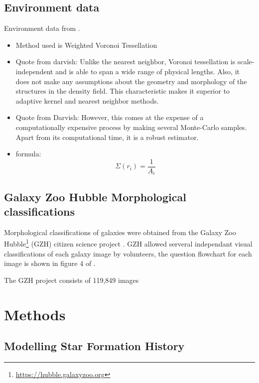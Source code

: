 \documentclass[a4paper,fleqn,usenatbib]{mnras}
\begin{document}
   

   \subsection{Environment data}
   
   Environment data from \cite{darvish2015}.

   \begin{itemize}
      \item Method used is Weighted Voronoi Tessellation
      \item  Quote from darvish: Unlike the nearest neighbor, Voronoi tessellation is scale-independent and is able to span a wide range of physical lengths. Also, it
does not make any assumptions about the geometry and
morphology of the structures in the density field. This
characteristic makes it superior to adaptive kernel and
nearest neighbor methods.

       \item  Quote from Darvish: However, this comes at the expense
of a computationally expensive process by
making several Monte-Carlo samples. Apart from
its computational time, it is a robust estimator.

      \item formula: \begin{equation}\Sigma(r_{i})=\frac{1}{A_{i}}\end{equation}
   \end{itemize}


   \subsection{Galaxy Zoo Hubble Morphological classifications}
   
   Morphological classifications of galaxies were obtained from the Galaxy Zoo Hubble\footnote{\url{https://hubble.galaxyzoo.org}} (GZH) citizen 
   science project \citep{galaxyzooHubble}. GZH allowed serveral independant visual classifications of each galaxy image by volunteers, the question flowchart for each
   image is shown in figure 4 of \cite{galaxyzooHubble}.

   The GZH project consists of 119,849 images 

\section{Methods}   

\subsection{Modelling Star Formation History}
\end{document}
